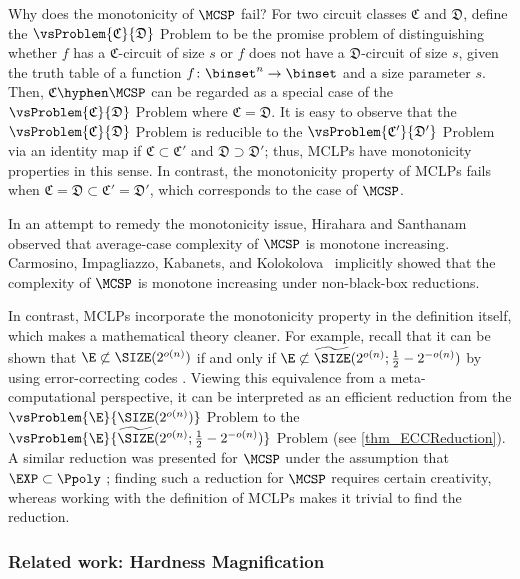 \documentclass[11pt]{article}
\numberwithin{equation}{section}
\theoremstyle{definition}
\theoremstyle{plain}
\begin{document}
Why does the monotonicity of $\MCSP$ fail?
For two circuit classes $\mathfrak{C}$ and $\mathfrak{D}$,
define the $\vsProblem{\mathfrak{C}}{\mathfrak{D}}$ Problem
to be the promise problem of distinguishing
whether $f$ has a $\mathfrak{C}$-circuit of size $s$
or $f$ does not have a $\mathfrak{D}$-circuit of size $s$,
given the truth table of a function $f \colon \binset^n \to \binset$
and a size parameter $s$.
Then,
$\mathfrak{C}\hyphen\MCSP$ can be regarded as a special case of the $\vsProblem{\mathfrak{C}}{\mathfrak{D}}$ Problem where $\mathfrak{C} = \mathfrak{D}$.
It is easy to observe that
the $\vsProblem{\mathfrak{C}}{\mathfrak{D}}$ Problem is reducible to
the $\vsProblem{\mathfrak{C'}}{\mathfrak{D'}}$ Problem via an identity map
if $\mathfrak{C} \subset \mathfrak{C'}$
and
$\mathfrak{D} \supset \mathfrak{D'}$;
thus, MCLPs have monotonicity properties in this sense.
In contrast,
the monotonicity property of MCLPs fails when
$\mathfrak{C} = \mathfrak{D} \subset \mathfrak{C}' = \mathfrak{D}'$,
which corresponds to the case of $\MCSP$.

In an attempt to remedy the monotonicity issue,
Hirahara and Santhanam~\cite{HiraharaS17_coco_conf}
observed that
average-case complexity of $\MCSP$ is monotone increasing.
%
%
Carmosino, Impagliazzo, Kabanets, and Kolokolova~\cite{CarmosinoIKK16_coco_conf}
implicitly showed
that
the complexity of $\MCSP$ is monotone increasing under non-black-box reductions.

In contrast,
MCLPs incorporate
the monotonicity property
in the definition itself,
which makes a mathematical theory cleaner.
For example,
recall that
it can be shown that
$\E \not\subset \SIZE(2^{o(n)})$
if and only if
$\E \not\subset \widetilde{\SIZE}(2^{o(n)}; \frac{1}{2} - 2^{-o(n)})$
by using error-correcting codes \cite{SudanTV01_jcss_journals}.
Viewing this equivalence from a meta-computational perspective,
it can be interpreted as an efficient reduction
from
the $\vsProblem{\E}{\SIZE(2^{o(n)})}$ Problem
to
the $\vsProblem{\E}{\widetilde{\SIZE}(2^{o(n)}; \frac{1}{2} - 2^{-o(n)})}$ Problem
%
(see \cref{thm_ECCReduction}). %
A similar reduction was presented for $\MCSP$ under the assumption that $\EXP \subset \Ppoly$ \cite{ChenHOPRS20_innovations_conf};
finding such a reduction for $\MCSP$ requires certain creativity,
whereas working with the definition of MCLPs makes it trivial to find the reduction.
%


\subsubsection{Related work: Hardness Magnification}
\end{document}
